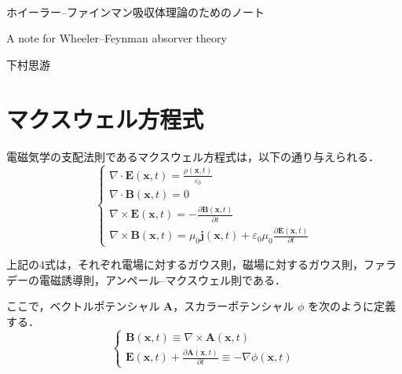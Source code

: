 \documentclass[10pt, a5paper, twoside]{jsarticle}
\theoremstyle{definition}
\begin{document}
	~ %

	\begin{center}

		\Large{ホイーラー--ファインマン吸収体理論のためのノート}

		\vspace{3mm}

		\large{A note for Wheeler--Feynman absorver theory}

		\vspace{3mm}
		
		\large{下村思游}

	\end{center}

	\section{マクスウェル方程式}

		電磁気学の支配法則であるマクスウェル方程式は，以下の通り与えられる．
		\begin{equation*}
			\begin{cases}
				\nabla \cdot \boldsymbol{E}(\boldsymbol{x}, t) = \displaystyle \frac{\rho (\boldsymbol{x}, t)}{\varepsilon_0} \\ \nabla \cdot \boldsymbol{B} (\boldsymbol{x}, t) = 0 \\ \nabla \times \boldsymbol{E}(\boldsymbol{x}, t) = - \displaystyle \frac{\partial \boldsymbol{B}(\boldsymbol{x}, t)}{\partial t} \\ \nabla \times \boldsymbol{B}(\boldsymbol{x}, t) = \mu_0 \boldsymbol{j}(\boldsymbol{x}, t) + \varepsilon_0 \mu_0 \displaystyle \frac{\partial \boldsymbol{E}(\boldsymbol{x}, t)}{\partial t}
			\end{cases}
		\end{equation*}

		上記の4式は，それぞれ電場に対するガウス則，磁場に対するガウス則，ファラデーの電磁誘導則，アンペール--マクスウェル則である．

		ここで，ベクトルポテンシャル \( \boldsymbol{A} \)，スカラーポテンシャル \( \phi \) を次のように定義する．
		\begin{equation*}
			\begin{cases}
				\boldsymbol{B}(\boldsymbol{x}, t) \equiv \nabla \times \boldsymbol{A}(\boldsymbol{x}, t) \\ \boldsymbol{E}(\boldsymbol{x}, t) + \displaystyle \frac{\partial \boldsymbol{A}(\boldsymbol{x}, t)}{\partial t} \equiv - \nabla \phi (\boldsymbol{x}, t)
			\end{cases}
		\end{equation*}
\end{document}
